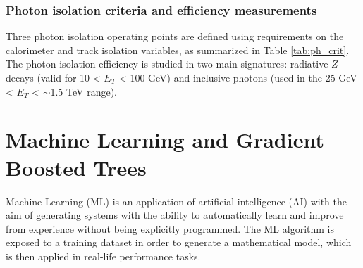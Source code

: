 \documentclass[a4paper, oneside, 11pt, openright]{book}
\begin{document}
		\subsection{Photon isolation criteria and efficiency measurements}
			Three photon isolation operating points are defined using requirements on the calorimeter and track isolation variables, as summarized in Table \ref{tab:ph_crit}. The photon isolation efficiency is studied in two main signatures: radiative $Z$ decays (valid for 10 < $E_T$ < 100 GeV) and inclusive photons (used in the 25 GeV < $E_T$ < $\sim$1.5 TeV range).
			
		
			\begin{center}
				\small
				\begin{table}[htbp]
					\caption{Definition of the photon isolation working points.}
					\label{tab:ph_crit} 
				\end{table}
			\end{center}
		
		
		
	\chapter{Machine Learning and Gradient Boosted Trees}
		Machine Learning (ML) is an application of artificial intelligence (AI) \cite{Lifelong ML} with the aim of generating systems with the ability to automatically learn and improve from experience without being explicitly programmed. The ML algorithm is exposed to a training dataset in order to generate a mathematical model, which is then applied in real-life performance tasks. %
		
\end{document}
